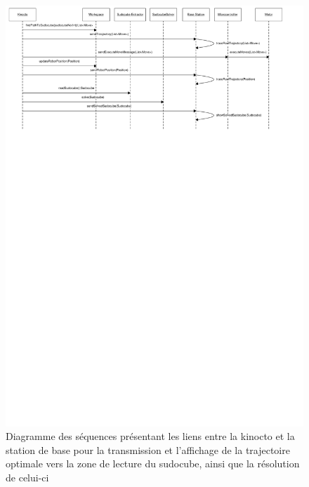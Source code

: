 \begin{figure}[htb]
\includegraphics[scale=0.9]{fig/diagrammes_sequence3.pdf}
\caption{Diagramme des séquences présentant les liens entre la kinocto et la station de base pour la transmission et l'affichage de la trajectoire optimale vers la zone de lecture du sudocube, ainsi que la résolution de celui-ci}
\label{diagSeq3Ite1}
\end{figure}
